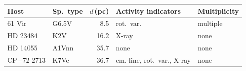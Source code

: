 \begin{tabular}{@{}llr p{1.75cm} l@{}}
\hline
Host & Sp.\ type & $d$\,(pc) & Activity indicators & Multiplicity \\
\hline
61 Vir & G6.5V & 8.5 & rot.\ var. & multiple \\
HD 23484 & K2V & 16.2 & X-ray & none \\
HD 14055 & A1Vnn & 35.7 & none & none \\
CP$-$72 2713 & K7Ve & 36.7 & em.-line, rot.\ var., X-ray & none \\
\hline
\end{tabular}
